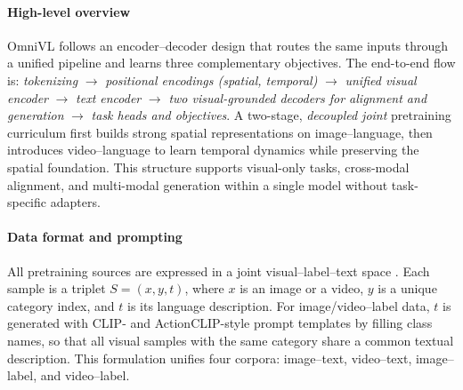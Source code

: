 \begin{enrichment}
\begin{enrichment}
        \paragraph{High-level overview}
        OmniVL \cite{wang2022_omnivl} follows an encoder–decoder design that routes the same inputs through a unified pipeline and learns three complementary objectives. The end-to-end flow is: \emph{tokenizing} \(\rightarrow\) \emph{positional encodings (spatial, temporal)} \(\rightarrow\) \emph{unified visual encoder} \(\rightarrow\) \emph{text encoder} \(\rightarrow\) \emph{two visual-grounded decoders for alignment and generation} \(\rightarrow\) \emph{task heads and objectives}. A two-stage, \emph{decoupled joint} pretraining curriculum first builds strong spatial representations on image–language, then introduces video–language to learn temporal dynamics while preserving the spatial foundation. This structure supports visual-only tasks, cross-modal alignment, and multi-modal generation within a single model without task-specific adapters. 
        
        \paragraph{Data format and prompting}
        All pretraining sources are expressed in a joint visual–label–text space \cite{wang2022_omnivl}. Each sample is a triplet \(S=(x,y,t)\), where \(x\) is an image or a video, \(y\) is a unique category index, and \(t\) is its language description. For image/video–label data, \(t\) is generated with CLIP- and ActionCLIP-style prompt templates by filling class names, so that all visual samples with the same category share a common textual description. This formulation unifies four corpora: image–text, video–text, image–label, and video–label. 
        

\end{enrichment}
\end{enrichment}
